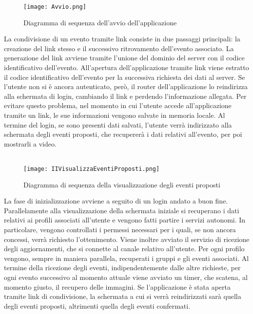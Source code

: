 \begin{figure}[h!]
    \begin{center}
        \texttt{[image: Avvio.png]}
        \caption{Diagramma di sequenza dell'avvio dell'applicazione}
    \end{center}
\end{figure}

La condivisione di un evento tramite link consiste in due passaggi principali: 
la creazione del link stesso e il successivo ritrovamento dell'evento associato.
La generazione del link avviene tramite 
l'unione del dominio del server con il codice identificativo dell'evento.
\clearpage
All'apertura dell'applicazione tramite link viene estratto il codice identificativo dell'evento 
per la successiva richiesta dei dati al server.
Se l'utente non si è ancora autenticato, però, 
il router dell'applicazione lo reindirizza alla schermata di login, 
cambiando il link e perdendo l'informazione allegata.
Per evitare questo problema, 
nel momento in cui l'utente accede all'applicazione tramite un link,
le sue informazioni vengono salvate in memoria locale.
Al termine del login, se sono presenti dati salvati, 
l'utente verrà indirizzato alla schermata degli eventi proposti, 
che recupererà i dati relativi all'evento, per poi mostrarli a video.\\
\\

\begin{figure}[h!]
    \begin{center}
        \texttt{[image: IIVisualizzaEventiProposti.png]}
        \caption{Diagramma di sequenza della visualizzazione degli eventi proposti}
    \end{center}
\end{figure}

\clearpage

La fase di inizializzazione avviene a seguito di un login andato a buon fine.
Parallelamente alla visualizzazione della schermata iniziale si recuperano i dati 
relativi ai profili associati all'utente e vengono fatti partire i servizi autonomi. 
In particolare, vengono controllati i permessi necessari per i quali, se non ancora concessi, 
verrà richiesto l'ottenimento. 
Viene inoltre avviato il servizio di ricezione degli aggiornamenti, 
che si connette al canale relativo all'utente.
Per ogni profilo vengono, sempre in maniera parallela, recuperati i gruppi e gli eventi associati.
Al termine della ricezione degli eventi, indipendentemente dalle altre richieste, 
per ogni evento successivo al momento attuale viene avviato un timer, che scatena, 
al momento giusto, il recupero delle immagini.
Se l'applicazione è stata aperta tramite link di condivisione, 
la schermata a cui si verrà reindirizzati sarà quella degli eventi proposti, 
altrimenti quella degli eventi confermati.\\
\\

